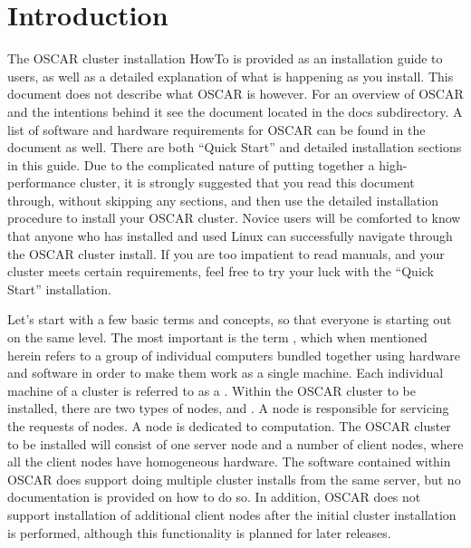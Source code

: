 %
%
%

\section{Introduction}

The OSCAR cluster installation HowTo is provided as an installation
guide to users, as well as a detailed explanation of what is happening
as you install. This document does not describe what OSCAR is however.
For an overview of OSCAR and the intentions behind it see the
 document located in the docs subdirectory.
A list of software and hardware requirements for OSCAR can be found in
the  document as well.  There are both
``Quick Start'' and detailed installation sections in this guide. Due
to the complicated nature of putting together a high-performance
cluster, it is strongly suggested that you read this document through,
without skipping any sections, and then use the detailed installation
procedure to install your OSCAR cluster.  Novice users will be
comforted to know that anyone who has installed and used Linux can
successfully navigate through the OSCAR cluster install.  If you are
too impatient to read manuals, and your cluster meets certain
requirements, feel free to try your luck with the ``Quick Start''
installation.

Let's start with a few basic terms and concepts, so that everyone is
starting out on the same level. The most important is the term
, which when mentioned herein refers to a group of
individual computers bundled together using hardware and software in
order to make them work as a single machine. Each individual machine
of a cluster is referred to as a . Within the OSCAR cluster
to be installed, there are two types of nodes,  and
. A  node is responsible for servicing the
requests of  nodes.  A  node is dedicated to
computation.  The OSCAR cluster to be installed will consist of one
server node and a number of client nodes, where all the client nodes
have homogeneous hardware.  The software contained within OSCAR does
support doing multiple cluster installs from the same server, but no
documentation is provided on how to do so. In addition, OSCAR does not
support installation of additional client nodes after the initial
cluster installation is performed, although this functionality is
planned for later releases.

